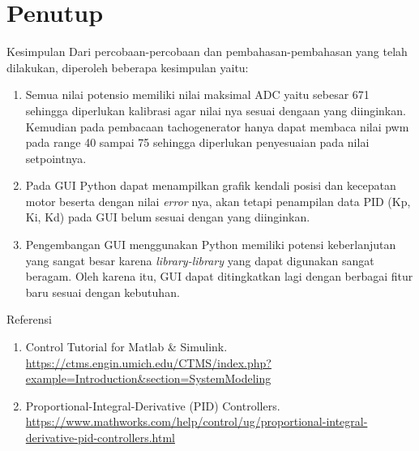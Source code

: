 \documentclass[10pt,xcolor={dvipsnames}]{beamer}
\begin{document}
\section{Penutup}
\begin{frame}{Kesimpulan}
	Dari percobaan-percobaan dan pembahasan-pembahasan yang telah dilakukan, diperoleh beberapa kesimpulan yaitu:
	\begin{enumerate}
		\item Semua nilai potensio memiliki nilai maksimal ADC yaitu sebesar 671 sehingga diperlukan kalibrasi agar nilai nya sesuai dengaan yang diinginkan. Kemudian pada pembacaan tachogenerator hanya dapat membaca nilai pwm pada range 40 sampai 75 sehingga diperlukan penyesuaian pada nilai setpointnya. 
		\item Pada GUI Python dapat menampilkan grafik kendali posisi dan kecepatan motor beserta dengan nilai \textit{error} nya, akan tetapi penampilan data PID (Kp, Ki, Kd) pada GUI belum sesuai dengan yang diinginkan.
		\item Pengembangan GUI menggunakan Python memiliki potensi keberlanjutan yang sangat besar karena \textit{library-library} yang dapat digunakan sangat beragam. Oleh karena itu, GUI dapat ditingkatkan lagi dengan berbagai fitur baru sesuai dengan kebutuhan.
	\end{enumerate}
\end{frame}
\begin{frame}{Referensi}
\begin{enumerate}
	\item Control Tutorial for Matlab \& Simulink. \url{https://ctms.engin.umich.edu/CTMS/index.php?example=Introduction&section=SystemModeling}
	\item Proportional-Integral-Derivative (PID) Controllers. \url{https://www.mathworks.com/help/control/ug/proportional-integral-derivative-pid-controllers.html}
\end{enumerate}
\end{frame}
\begin{frame}
	\centering
\end{frame}
\end{document}
